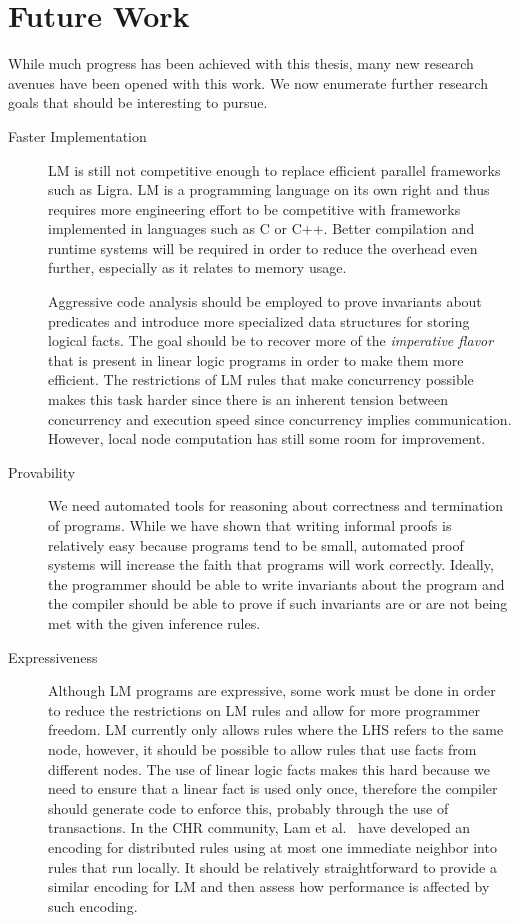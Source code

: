 \section{Future Work}

While much progress has been achieved with this thesis, many new research
avenues have been opened with this work. We now enumerate further research goals
that should be interesting to pursue.

\begin{description}
   \item[Faster Implementation]

LM is still not competitive enough to replace efficient parallel frameworks such
as Ligra. LM is a programming language on its own right and thus requires more
engineering effort to be competitive with frameworks implemented in languages
such as C or C++. Better compilation and runtime systems will be required in
order to reduce the overhead even further, especially as it relates to memory
usage.

Aggressive code analysis should be employed to prove invariants about predicates
and introduce more specialized data structures for storing logical facts. The
goal should be to recover more of the \emph{imperative flavor} that is present
in linear logic programs in order to make them more efficient. The restrictions
of LM rules that make concurrency possible makes this task harder since there is
an inherent tension between concurrency and execution speed since concurrency
implies communication. However, local node computation has still some room for
improvement.

\item[Provability]

We need automated tools for reasoning about correctness and termination of
programs. While we have shown that writing informal proofs is relatively easy
because programs tend to be small, automated proof systems will increase the
faith that programs will work correctly. Ideally, the programmer should be able
to write invariants about the program and the compiler should be able to prove
if such invariants are or are not being met with the given inference rules.

\item[Expressiveness]

Although LM programs are expressive, some work must be done in order to reduce
the restrictions on LM rules and allow for more programmer freedom.  LM
currently only allows rules where the LHS refers to the same node, however, it
should be possible to allow rules that use facts from different nodes. The use
of linear logic facts makes this hard because we need to ensure that a linear
fact is used only once, therefore the compiler should generate code to enforce
this, probably through the use of transactions. In the CHR community, Lam et
al.~\cite{Lam:2013:DEC:2505879.2505892} have developed an encoding for
distributed rules using at most one immediate neighbor into rules that run
locally. It should be relatively straightforward to provide a similar encoding
for LM and then assess how performance is affected by such encoding.


\end{description}
